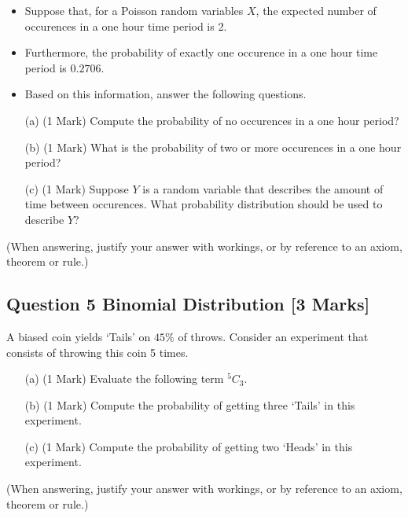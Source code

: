 \documentclass[a4paper,12pt]{article}
\begin{document}
\begin{itemize}
\item Suppose that, for a Poisson random variables $X$, the expected number of occurences in a one hour time period is 2. 


\item Furthermore, the probability of exactly one occurence in a one
 hour time period is $0.2706$.

\item Based on this information, answer the following questions.
\end{itemize}
\begin{itemize}
\item[(a)] (1 Mark) Compute the probability of no occurences in a one hour period?
\item[(b)] (1 Mark) What is the probability of two or more occurences in a one hour period?
\item[(c)] (1 Mark) Suppose $Y$ is a random variable that describes the amount of time between occurences. What probability distribution should be used to describe $Y$?
\end{itemize}


\noindent (When answering, justify your answer with workings, or by reference to an
axiom, theorem or rule.)

\newpage

\subsection*{Question 5 Binomial Distribution [3 Marks] } %
A biased coin yields `Tails' on $45\%$ of throws. Consider an experiment that consists of throwing this coin 5 times.
\begin{itemize}
\item[(a)] (1 Mark) Evaluate the following term $^{5}C_3$.
\item[(b)] (1 Mark) Compute the probability of getting three `Tails' in this experiment.
\item[(c)] (1 Mark) Compute the probability of getting two `Heads' in this experiment.
\end{itemize}

\noindent(When answering, justify your answer with workings, or by reference to an
axiom, theorem or rule.)

\bigskip
\end{document}
